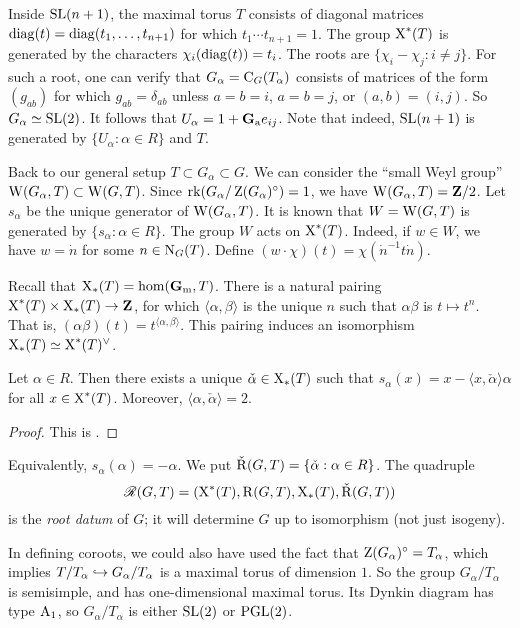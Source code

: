\begin{example}
Inside $\operatorname{SL}(n+1)$, the maximal torus $T$ consists of diagonal matrices 
$\operatorname{diag}(t)=\operatorname{diag}(t_1,\dots,t_{n+1})$ for which 
$t_1\dotsm t_{n+1}=1$. The group $\operatorname{X}^\ast(T)$ is generated by the 
characters $\chi_i(\operatorname{diag}(t))=t_i$. The roots are 
$\{\chi_i-\chi_j:i\ne j\}$. For such a root, one can verify that 
$G_\alpha=\operatorname{C}_G(T_\alpha)$ consists of matrices of the 
form $(g_{a b})$ for which $g_{a b}=\delta_{a b}$ unless 
$a=b=i$, $a=b=j$, or $(a,b)=(i,j)$. So $G_\alpha\simeq \operatorname{SL}(2)$. 
It follows that $U_\alpha = 1+\mathbf{G}_\mathrm{a} e_{i j}$. Note that indeed, $\operatorname{SL}(n+1)$ is 
generated by $\{U_\alpha:\alpha\in R\}$ and $T$. 
\end{example}

Back to our general setup $T\subset G_\alpha\subset G$. We can consider the 
``small Weyl group'' $\operatorname{W}(G_\alpha,T)\subset \operatorname{W}(G,T)$. Since 
$\operatorname{rk}(G_\alpha/\operatorname{Z}(G_\alpha)^\circ)=1$, we have 
$\operatorname{W}(G_\alpha,T)=\mathbf{Z}/2$. Let $s_\alpha$ be the unique generator of 
$\operatorname{W}(G_\alpha,T)$. It is known that $W=\operatorname{W}(G,T)$ is generated by 
$\{s_\alpha:\alpha\in R\}$. The group $W$ acts on $\operatorname{X}^\ast(T)$. 
Indeed, if $w\in W$, we have $w=\dot n$ for some $n\in \operatorname{N}_G(T)$. 
Define $(w\cdot\chi)(t)=\chi(\dot n^{-1} t \dot n)$. 

Recall that $\operatorname{X}_\ast(T)=\hom(\mathbf{G}_\mathrm{m},T)$. There is a natural pairing 
$\operatorname{X}^\ast(T)\times \operatorname{X}_\ast(T)\to \mathbf{Z}$, for which 
$\langle \alpha,\beta\rangle$ is the unique $n$ such that $\alpha\beta$ is 
$t\mapsto t^n$. That is, $(\alpha\beta)(t) = t^{\langle\alpha,\beta\rangle}$. 
This pairing induces an isomorphism 
$\operatorname{X}_\ast(T)\simeq \operatorname{X}^\ast(T)^\vee$. 

\begin{theorem}
Let $\alpha\in R$. Then there exists a unique 
$\check\alpha\in \operatorname{X}_\ast(T)$ such that 
$s_\alpha(x) = x-\langle x,\check\alpha\rangle\alpha$ for all 
$x\in \operatorname{X}^\ast(T)$. Moreover, $\langle\alpha,\check\alpha\rangle=2$. 
\end{theorem}
\begin{proof}
This is \cite[XXII 1.1.ii]{sga3-iii}. 
\end{proof}

Equivalently, $s_\alpha(\alpha)=-\alpha$. We put 
$\check{\operatorname{R}}(G,T)=\{\check\alpha:\alpha\in R\}$. The quadruple 
\[
  \mathscr{R}(G,T) = (\operatorname{X}^\ast(T),\operatorname{R}(G,T),\operatorname{X}_\ast(T),\check {\operatorname{R}}(G,T))
\]
is the \emph{root datum} of $G$; it will determine $G$ up to isomorphism (not 
just isogeny). 

In defining coroots, we could also have used the fact that 
$\operatorname{Z}(G_\alpha)^\circ=T_\alpha$, which implies 
$T/T_\alpha\hookrightarrow G_\alpha/T_\alpha$ is a maximal torus of dimension $1$. So 
the group $G_\alpha/T_\alpha$ is semisimple, and has one-dimensional maximal 
torus. Its Dynkin diagram has type $\mathrm{A}_1$, so $G_\alpha/T_\alpha$ is either 
$\operatorname{SL}(2)$ or $\operatorname{PGL}(2)$. 




